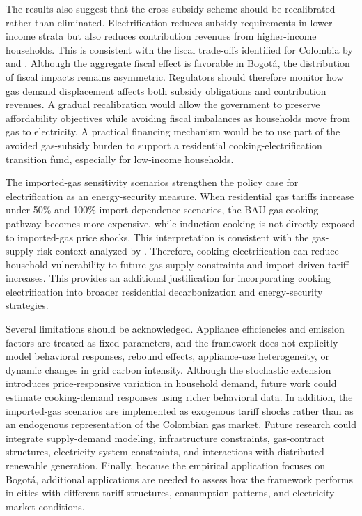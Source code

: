 \documentclass[authoryear,preprint,review,10pt]{elsarticle}
\begin{document}
The results also suggest that the cross-subsidy scheme should be recalibrated rather than eliminated. Electrification reduces subsidy requirements in lower-income strata but also reduces contribution revenues from higher-income households. This is consistent with the fiscal trade-offs identified for Colombia by \citet{cabrales2023costos} and \citet{cabrales2025subsidios_gas}. Although the aggregate fiscal effect is favorable in Bogotá, the distribution of fiscal impacts remains asymmetric. Regulators should therefore monitor how gas demand displacement affects both subsidy obligations and contribution revenues. A gradual recalibration would allow the government to preserve affordability objectives while avoiding fiscal imbalances as households move from gas to electricity. A practical financing mechanism would be to use part of the avoided gas-subsidy burden to support a residential cooking-electrification transition fund, especially for low-income households.

The imported-gas sensitivity scenarios strengthen the policy case for electrification as an energy-security measure. When residential gas tariffs increase under 50\% and 100\% import-dependence scenarios, the BAU gas-cooking pathway becomes more expensive, while induction cooking is not directly exposed to imported-gas price shocks. This interpretation is consistent with the gas-supply-risk context analyzed by \citet{cabrales2025fedesarrollo_gas_imports}. Therefore, cooking electrification can reduce household vulnerability to future gas-supply constraints and import-driven tariff increases. This provides an additional justification for incorporating cooking electrification into broader residential decarbonization and energy-security strategies.

Several limitations should be acknowledged. Appliance efficiencies and emission factors are treated as fixed parameters, and the framework does not explicitly model behavioral responses, rebound effects, appliance-use heterogeneity, or dynamic changes in grid carbon intensity. Although the stochastic extension introduces price-responsive variation in household demand, future work could estimate cooking-demand responses using richer behavioral data. In addition, the imported-gas scenarios are implemented as exogenous tariff shocks rather than as an endogenous representation of the Colombian gas market. Future research could integrate supply-demand modeling, infrastructure constraints, gas-contract structures, electricity-system constraints, and interactions with distributed renewable generation. Finally, because the empirical application focuses on Bogotá, additional applications are needed to assess how the framework performs in cities with different tariff structures, consumption patterns, and electricity-market conditions.
\end{document}
